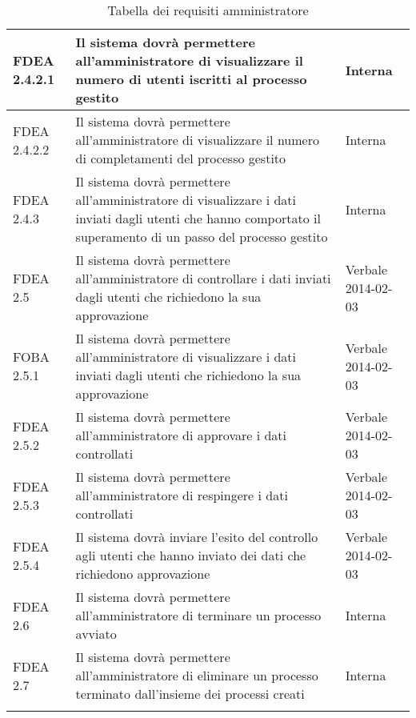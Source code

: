 \begin{longtable}{lXp{}}
\midrule
FDEA 2.4.2.1&Il sistema dovrà permettere all'amministratore di visualizzare il numero di utenti iscritti al processo gestito&Interna\\
\midrule
FDEA 2.4.2.2&Il sistema dovrà permettere all'amministratore di visualizzare il numero di completamenti del processo gestito&Interna\\
\midrule
FDEA 2.4.3&Il sistema dovrà permettere all'amministratore di visualizzare i dati inviati dagli utenti che hanno comportato il superamento di un passo del processo gestito&Interna\\
\midrule
FDEA 2.5&Il sistema dovrà permettere all'amministratore di controllare i dati inviati dagli utenti che richiedono la sua approvazione& Verbale 2014-02-03\\
\midrule
FOBA 2.5.1&Il sistema dovrà permettere all'amministratore di visualizzare i dati inviati dagli utenti che richiedono la sua approvazione&Verbale 2014-02-03\\
\midrule
FDEA 2.5.2&Il sistema dovrà permettere all'amministratore di approvare i dati controllati&Verbale 2014-02-03\\
\midrule
FDEA 2.5.3&Il sistema dovrà permettere all'amministratore di respingere i dati controllati&Verbale 2014-02-03\\
\midrule
FDEA 2.5.4&Il sistema dovrà inviare l'esito del controllo agli utenti che hanno inviato dei dati che richiedono approvazione&Verbale 2014-02-03\\
\midrule
FDEA 2.6&Il sistema dovrà permettere all'amministratore di terminare un processo avviato&Interna\\
\midrule
FDEA 2.7&Il sistema dovrà permettere all'amministratore di eliminare un processo terminato dall'insieme dei processi creati&Interna\\ 
\bottomrule
\caption{Tabella dei requisiti amministratore}
\end{longtable}